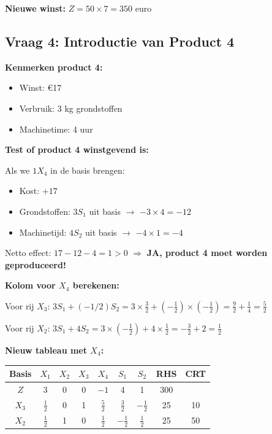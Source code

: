 \documentclass[a4paper,11pt]{article}
\begin{document}
\begin{oefenblok}[title=Productie Optimalisatie bij een Bedrijf]
\textbf{Nieuwe winst:} $Z = 50 \times 7 = 350$ euro

\subsection*{Vraag 4: Introductie van Product 4}

\textbf{Kenmerken product 4:}
\begin{itemize}
    \item Winst: €17
    \item Verbruik: 3 kg grondstoffen
    \item Machinetime: 4 uur
\end{itemize}

\textbf{Test of product 4 winstgevend is:}

Als we $1 X_4$ in de basis brengen:
\begin{itemize}
    \item Kost: $+17$
    \item Grondstoffen: $3 S_1$ uit basis $\rightarrow$ $-3 \times 4 = -12$
    \item Machinetijd: $4 S_2$ uit basis $\rightarrow$ $-4 \times 1 = -4$
\end{itemize}

Netto effect: $17 - 12 - 4 = 1 > 0$ $\Rightarrow$ \textbf{JA, product 4 moet worden geproduceerd!}

\textbf{Kolom voor $X_4$ berekenen:}

Voor rij $X_3$: $3S_1 + (-1/2)S_2 = 3 \times \frac{3}{2} + (-\frac{1}{2}) \times (-\frac{1}{2}) = \frac{9}{2} + \frac{1}{4} = \frac{5}{2}$

Voor rij $X_2$: $3S_1 + 4S_2 = 3 \times (-\frac{1}{2}) + 4 \times \frac{1}{2} = -\frac{3}{2} + 2 = \frac{1}{2}$

\textbf{Nieuw tableau met $X_4$:}

\begin{center}
\begin{tabular}{c|cccccc|c|c}
\hline
Basis & $X_1$ & $X_2$ & $X_3$ & $X_4$ & $S_1$ & $S_2$ & RHS & CRT \\
\hline
$Z$ & 3 & 0 & 0 & $-1$ & 4 & 1 & 300 & \\
$X_3$ & $\frac{1}{2}$ & 0 & 1 & $\frac{5}{2}$ & $\frac{3}{2}$ & $-\frac{1}{2}$ & 25 & 10 \\
$X_2$ & $\frac{1}{2}$ & 1 & 0 & $\frac{1}{2}$ & $-\frac{1}{2}$ & $\frac{1}{2}$ & 25 & 50 \\
\hline
\end{tabular}
\end{center}


\end{oefenblok}
\end{document}
